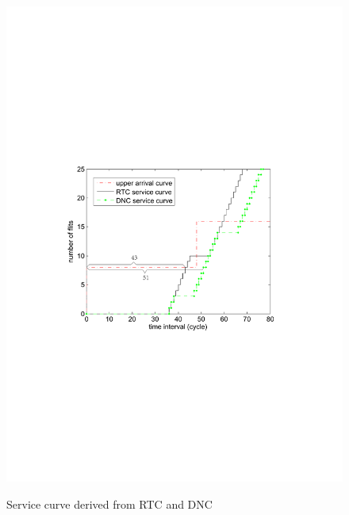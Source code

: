 \documentclass[preprint]{elsarticle}
\begin{document}
\begin{figure}
  \centering
  \includegraphics[scale=0.7]{figures/loose.pdf}\\
  \caption{Service curve derived from RTC and DNC}\label{loose}
\end{figure}
\end{document}

